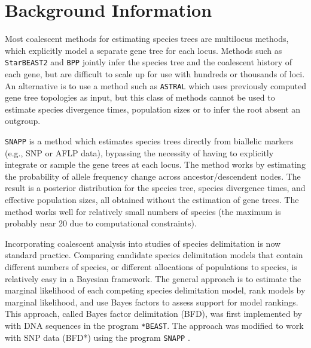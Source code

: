 \documentclass{article}
\begin{document}
\section{Background Information}
Most coalescent methods for estimating species trees are multilocus methods, which explicitly model a separate gene tree for each locus. Methods such as \texttt{StarBEAST2} \citep{Ogilvie:2017bf} and \texttt{BPP} \citep{Rannala:2017gs} jointly infer the species tree and the coalescent history of each gene, but are difficult to scale up for use with hundreds or thousands of loci. An alternative is to use a method such as \texttt{ASTRAL} \citep{Mirarab01092014, Mirarab15062015, ASTRALIII} which uses previously computed gene tree topologies as input, but this class of methods cannot be used to estimate species divergence times, population sizes or to infer the root absent an outgroup.

\texttt{SNAPP} is a method which estimates species trees directly from biallelic markers (e.g., SNP or AFLP data), bypassing the necessity of having to explicitly integrate or sample the gene trees at each locus. The method works by estimating the probability of allele frequency change across ancestor/descendent nodes. The result is a posterior distribution for the species tree, species divergence times, and effective population sizes, all obtained without the estimation of gene trees. The method works well for relatively small numbers of species (the maximum is probably near 20 due to computational constraints).

Incorporating coalescent analysis into studies of species delimitation is now standard practice. Comparing candidate species delimitation models that contain different numbers of species, or different allocations of populations to species, is relatively easy in a Bayesian framework. The general approach is to estimate the marginal likelihood \citep{baele12} of each competing species delimitation model, rank models by marginal likelihood, and use Bayes factors \citep{kass95} to assess support for model rankings. This approach, called Bayes factor delimitation (BFD), was first implemented by \citet{Grummer13} with DNA sequences in the program \texttt{*BEAST}. The approach was modified to work with SNP data (BFD*) using the program \texttt{SNAPP} \citep{Leache14}.
\end{document}
